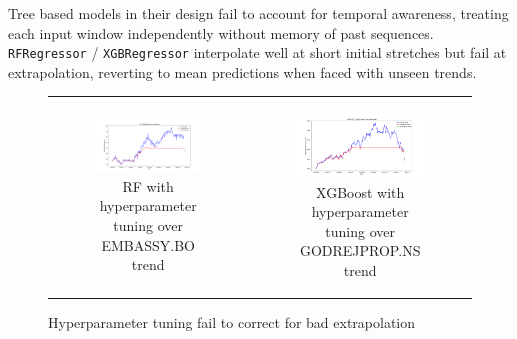 \documentclass[11pt]{article}
\begin{document}
Tree based models in their design fail to account for temporal awareness, treating each input window independently without memory of past sequences. \texttt{RFRegressor} / \texttt{XGBRegressor} interpolate well at short initial stretches but fail at extrapolation, reverting to mean predictions when faced with unseen trends.\cite{4}

\begin{figure}[h!]
    \centering
    \begin{tabular}{cc}
        \begin{subfigure}[b]{0.48\textwidth}
            \centering
            \includegraphics[width=\linewidth]{figures/rf_tuned/EMBASSY_predict.png}
            \caption{RF with hyperparameter tuning over EMBASSY.BO trend}
            \label{fig:1a}
        \end{subfigure} &
        \begin{subfigure}[b]{0.48\textwidth}
            \centering
            \includegraphics[width=\linewidth]{figures/xgboost_tuned/GODREJPROP_predict.png}
            \caption{XGBoost with hyperparameter tuning over GODREJPROP.NS trend}
            \label{fig:1b}
        \end{subfigure} \\
    \end{tabular}
    \caption{Hyperparameter tuning fail to correct for bad extrapolation}
    \label{fig:4x2grid}
\end{figure}
\end{document}
